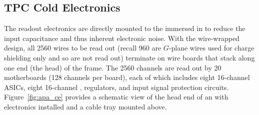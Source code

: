 \begin{comment}
\begin{dunetable}[APA interface control documents]{lr}{tab:apa_interface_docdb}
{Summary of interface control documents being developed.}  
  Interface Document & DUNE DocDB number \\\colhline 
  Interface to TPC electronics & 6670 \\ \colhline 
  Interface to photon detector system & 6667 \\ \colhline
  Interface to drift high voltage system & 6673 \\ \colhline
  Interface to DAQ & 6676 \\ \colhline
  Interface to slow controls and cryogenics infrastructure & 6679 \\\specialrule{1.5pt}{1pt}{1pt}
  Integration facility interface & 7021 \\ \colhline
  Facility interfaces (Detector Hall, Cryostat, and Cryogenics) & 6967 \\ \colhline
  Installation interface & 6994 \\ \colhline
  Calibration interface & 7048 \\\specialrule{1.5pt}{1pt}{1pt}
  Software computing interface & 7102 \\ \colhline
  Physics interface & 7075 \\ \colhline
\end{dunetable}
\end{comment}


\subsection{TPC Cold Electronics}
\label{sec:fdsp-apa-intfc-elec}

The  readout electronics are directly mounted to the  immersed in  to reduce the input capacitance and thus inherent electronic noise.  With the wire-wrapped design, all \num{2560} wires to be read out (recall \num{960} are $G$-plane wires used for charge shielding only and so are not read out) terminate on wire boards that stack along one end (the head) of the  frame.  The \num{2560} channels are read out by \num{20}  motherboards (\num{128} channels per board), each of which includes eight \num{16}-channel  ASICs, eight \num{16}-channel  ,  regulators, and input signal protection circuits.  Figure~\ref{fig:apa_ce} provides a schematic view of the head end of an  with electronics installed and a cable tray mounted above. 


